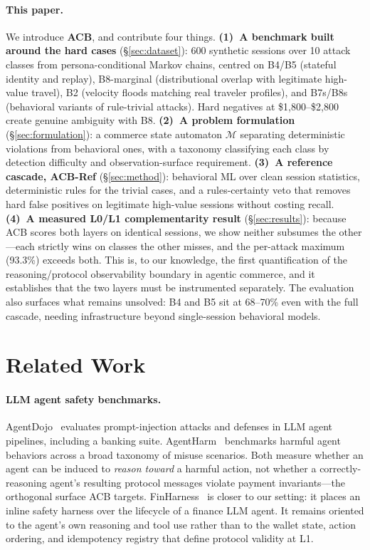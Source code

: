 \documentclass{article}
\begin{document}
\paragraph{This paper.} We introduce \textbf{ACB}, and contribute four things.
\textbf{(1)~A benchmark built around the hard cases} (\S\ref{sec:dataset}): 600 synthetic
sessions over 10 attack classes from persona-conditional Markov chains, centred on B4/B5
(stateful identity and replay), B8-marginal (distributional overlap with legitimate
high-value travel), B2 (velocity floods matching real traveler profiles), and B7s/B8s
(behavioral variants of rule-trivial attacks). Hard negatives at \$1,800--\$2,800 create
genuine ambiguity with B8. \textbf{(2)~A problem formulation} (\S\ref{sec:formulation}): a
commerce state automaton $\mathcal{M}$ separating deterministic violations from behavioral
ones, with a taxonomy classifying each class by detection difficulty and observation-surface
requirement. \textbf{(3)~A reference cascade, ACB-Ref} (\S\ref{sec:method}): behavioral ML
over clean session statistics, deterministic rules for the trivial cases, and a
rules-certainty veto that removes hard false positives on legitimate high-value sessions
without costing recall. \textbf{(4)~A measured L0/L1 complementarity result}
(\S\ref{sec:results}): because ACB scores both layers on identical sessions, we show neither
subsumes the other---each strictly wins on classes the other misses, and the per-attack
maximum (93.3\%) exceeds both. This is, to our knowledge, the first quantification of the
reasoning/protocol observability boundary in agentic commerce, and it establishes that the
two layers must be instrumented separately. The evaluation also surfaces what remains
unsolved: B4 and B5 sit at 68--70\% even with the full cascade, needing infrastructure beyond
single-session behavioral models.


\section{Related Work}
\label{sec:related}

\paragraph{LLM agent safety benchmarks.}
AgentDojo~\cite{agentdojo} evaluates prompt-injection attacks and defenses in LLM agent
pipelines, including a banking suite. AgentHarm~\cite{agentharm} benchmarks harmful agent
behaviors across a broad taxonomy of misuse scenarios. Both measure whether an agent can be
induced to \emph{reason toward} a harmful action, not whether a correctly-reasoning agent's
resulting protocol messages violate payment invariants---the orthogonal surface ACB targets.
FinHarness~\cite{finharness} is closer to our setting: it places an inline safety harness
over the lifecycle of a finance LLM agent. It remains oriented to the agent's own reasoning
and tool use rather than to the wallet state, action ordering, and idempotency registry that
define protocol validity at L1.
\end{document}
